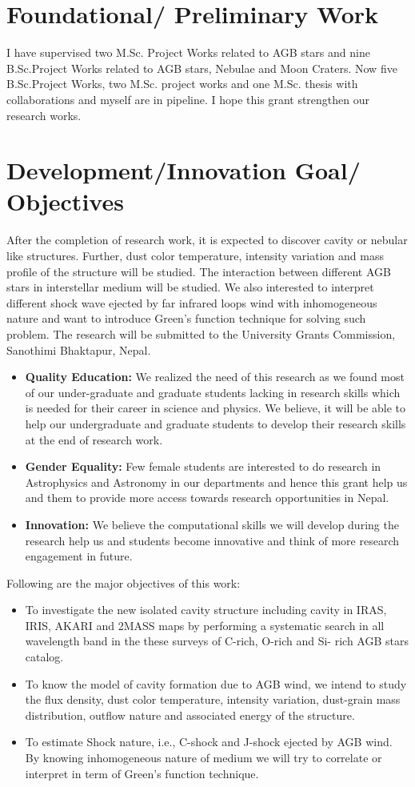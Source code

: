 \documentclass[fleqn,a4paper,12pt,oneside]{article}
\begin{document}
\section{Foundational/ Preliminary Work} 
I have supervised two M.Sc. Project Works related to AGB stars and nine B.Sc.Project Works related to AGB stars, Nebulae and Moon Craters.
Now five B.Sc.Project Works, two M.Sc. project works and one M.Sc. thesis with collaborations and myself are in pipeline. I hope this grant strengthen our research works. 

\section{Development/Innovation Goal/ Objectives} 
After the completion of  research work, it is expected to discover cavity or nebular like structures. Further, dust color temperature,  intensity variation and mass profile of the structure will be studied. The interaction between different AGB stars in  interstellar medium will be studied. We also interested to interpret different shock wave ejected by far infrared loops wind with inhomogeneous nature and want to introduce Green’s function technique for solving such problem. The research will be submitted to the University Grants Commission, Sanothimi Bhaktapur, Nepal.
\begin{itemize}
\item {\bf{Quality Education:}} We realized the need of this research as we found most of our under-graduate and graduate students lacking in  research skills which is needed for their career in science and physics. We believe, it will be able to help our undergraduate and graduate students to develop their research skills at the end of  research work.
\item {\bf Gender Equality:} Few  female students are interested to do research in Astrophysics and Astronomy in our departments and hence this grant help us and them to provide  more access towards research opportunities in Nepal.
\item {\bf Innovation:} We believe the computational skills we will develop during the research help us and students become innovative and think of more research engagement in future.
\end{itemize}
Following are the  major objectives of this
work:
\begin{itemize} 
	\item To investigate the new isolated cavity structure including cavity in
	IRAS, IRIS, AKARI and 2MASS maps by performing a systematic search in all wavelength
	band in the these surveys of C-rich, O-rich and  Si- rich AGB stars catalog.
	\item To know the model of cavity formation due to AGB wind, we intend to study the flux density, dust color temperature, intensity variation, dust-grain mass distribution, outflow nature and associated energy of the structure.
	\item To estimate Shock nature, i.e., C-shock and J-shock\cite{5} ejected by AGB
	wind. By knowing inhomogeneous nature of medium we will try to
	correlate or interpret in term of Green's function technique.
\end{itemize}
\end{document}

